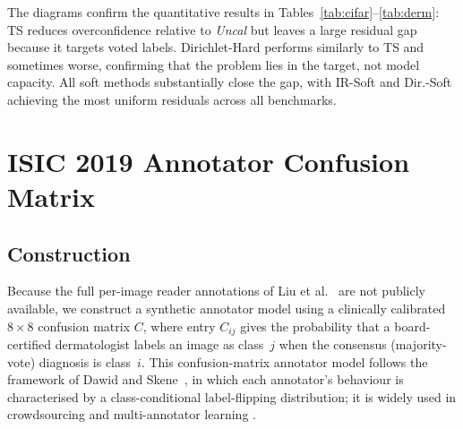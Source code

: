 \documentclass[10pt,journal,compsoc]{IEEEtran}
\begin{document}
\bigskip
The diagrams confirm the quantitative results in Tables~\ref{tab:cifar}--\ref{tab:derm}: TS reduces overconfidence relative to \emph{Uncal} but leaves a large residual gap because it targets voted labels.  Dirichlet-Hard performs similarly to TS and sometimes worse, confirming that the problem lies in the target, not model capacity.  All soft methods substantially close the gap, with IR-Soft and Dir.-Soft achieving the most uniform residuals across all benchmarks.

\section{ISIC 2019 Annotator Confusion Matrix}
\label{app:isic-confusion}

\subsection{Construction}

Because the full per-image reader annotations of Liu et al.~\cite{liu2020deep} are not publicly
available, we construct a synthetic annotator model using a clinically calibrated
$8{\times}8$ confusion matrix $C$, where entry $C_{ij}$ gives the probability that a
board-certified dermatologist labels an image as class~$j$ when the consensus
(majority-vote) diagnosis is class~$i$.  This confusion-matrix annotator model follows
the framework of Dawid and Skene~\cite{dawid1979maximum}, in which each annotator's behaviour is
characterised by a class-conditional label-flipping distribution; it is widely used
in crowdsourcing and multi-annotator learning \cite{rodrigues2018deep,uma2021learning}.
\end{document}
